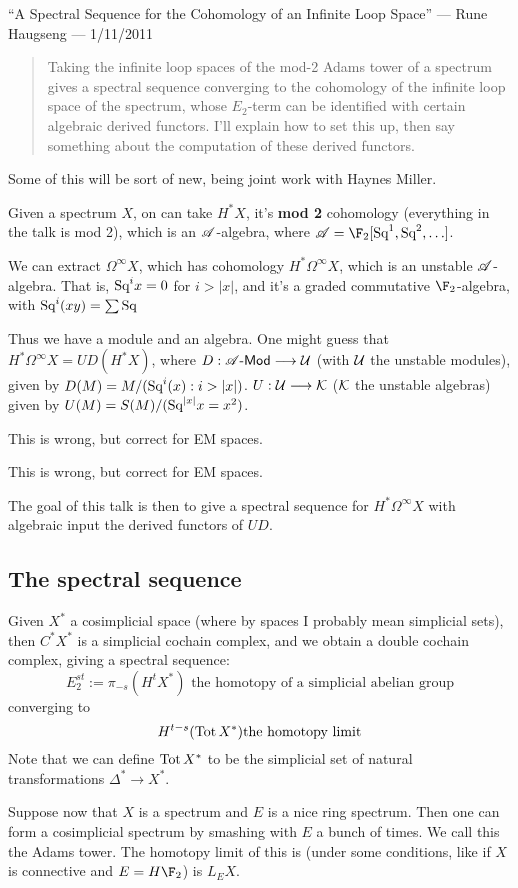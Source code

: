 \begin{RuneBabytop}
\KanSemResponse
{``A Spectral Sequence for the Cohomology of an Infinite Loop Space'' --- Rune Haugseng --- 1/11/2011}
\begin{abstract}
Taking the infinite loop spaces of the mod-2 Adams tower of a
spectrum gives a spectral sequence converging to the cohomology of the
infinite loop space of the spectrum, whose $E_2$-term can be identified with
certain algebraic derived functors. I'll explain how to set this up, then
say something about the computation of these derived functors.
\end{abstract}
Some of this will be sort of new, being joint work with Haynes Miller.

Given a spectrum $X$, on can take $H^*X$, it's \textbf{mod 2} cohomology (everything in the talk is mod 2), which is an $\mathscr{A}$-algebra, where $\Steen=\F_2[\Squ^1,\Squ^2,\ldots]$.

We can extract $\Omega^\infty X$, which has cohomology $H^*\Omega^\infty X$, which is an unstable $\mathscr{A}$-algebra. That is, $\textup{Sq}^ix=0$ for $i>|x|$, and it's a graded commutative $\F_2$-algebra, with $\textup{Sq}^i(xy)=\sum\textup{Sq}$ 

Thus we have a module and an algebra. One might guess that $H^*\Omega^\infty X=UD(H^*X)$, where $D:\mathscr{A}\operatorname{{\mathsf{\!-Mod}}}\longrightarrow\mathcal{U}$ (with $\mathcal{U}$ the unstable modules), given by $D(M)=M/(\textup{Sq}^i(x):i>|x|)$. $U:\mathcal{U}\longrightarrow\mathcal{K}$ ($\mathcal{K}$ the unstable algebras) given by $U(M)=S(M)/(\textup{Sq}^{|x|}x=x^2)$.

This is wrong, but correct for EM spaces.
\begin{thm*}
This is wrong, but correct for EM spaces.
\end{thm*}
The goal of this talk is then to give a spectral sequence for $H^*\Omega^\infty X$ with algebraic input the derived functors of $UD$.
\subsection*{The spectral sequence}
Given $X^*$ a cosimplicial space (where by spaces I probably mean simplicial sets), then $C^*X^*$ is a simplicial cochain complex, and we obtain a double cochain complex, giving a spectral sequence:
\[E_2^{st}:=\pi_{-s}(H^tX^*)\text{ the homotopy of a simplicial abelian group}\]
converging to
\[H^{t-s}(\textup{Tot}\, X^*)\text{the homotopy limit}\]
Note that we can define $\textup{Tot}\, X^*$ to be the simplicial set of natural transformations $\Delta^*\to X^*$.

Suppose now that $X$ is a spectrum and $E$ is a nice ring spectrum. Then one can form a cosimplicial spectrum by smashing with $E$ a bunch of times. We call this the Adams tower. The homotopy limit of this is (under some conditions, like if $X$ is connective and $E=H\F_2$) is $L_EX$.


\end{RuneBabytop}
